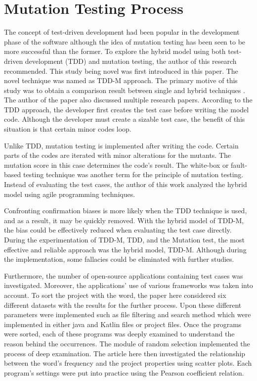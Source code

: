 \section{Mutation Testing Process}
The concept of test-driven development had been popular in the development phase of the software although the idea of mutation testing has been seen to be more successful than the former. To explore the hybrid model using both test-driven development (TDD) and mutation testing, the author of this research recommended. This study being novel was first introduced in this paper. The novel technique was named as TDD-M approach. The primary motive of this study was to obtain a comparison result between single and hybrid techniques \cite{ref27}. The author of the paper also discussed multiple research papers. According to the TDD approach, the developer first creates the test case before writing the model code. Although the developer must create a sizable test case, the benefit of this situation is that certain minor codes loop.\par 
Unlike TDD, mutation testing is implemented after writing the code. Certain parts of the codes are iterated with minor alterations for the mutants. The mutation score in this case determines the code's result. The white-box or fault-based testing technique was another term for the principle of mutation testing. Instead of evaluating the test cases, the author of this work analyzed the hybrid model using agile programming techniques.\par 
Confronting confirmation biases is more likely when the TDD technique is used, and as a result, it may be quickly removed. With the hybrid model of TDD-M, the bias could be effectively reduced when evaluating the test case directly. During the experimentation of TDD-M, TDD, and the Mutation test, the most effective and reliable approach was the hybrid model, TDD-M. Although during the implementation, some fallacies could be eliminated with further studies. \par 
Furthermore, the number of open-source applications containing test cases was investigated. Moreover, the applications' use of various frameworks was taken into account. To sort the project with the word, the paper here considered six different datasets with the results for the further process. Upon these different parameters were implemented such as file filtering and search method which were implemented in either java and Katlin files or project files. Once the programs were sorted, each of these programs was deeply examined to understand the reason behind the occurrences. The module of random selection implemented the process of deep examination. The article here then investigated the relationship between the word's frequency and the project properties using scatter plots. Each program's settings were put into practice using the Pearson coefficient relation.\\

